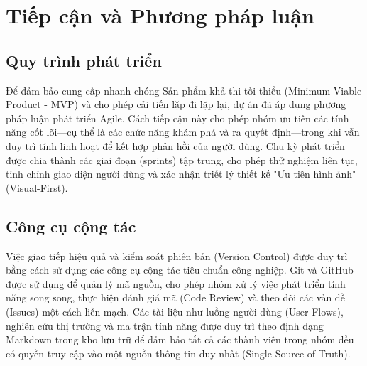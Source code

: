 \section{Tiếp cận và Phương pháp luận}
\label{sec:approach_methodology}

\subsection{Quy trình phát triển}
Để đảm bảo cung cấp nhanh chóng Sản phẩm khả thi tối thiểu (Minimum Viable Product - MVP) và cho phép cải tiến lặp đi lặp lại, dự án đã áp dụng phương pháp luận phát triển Agile. Cách tiếp cận này cho phép nhóm ưu tiên các tính năng cốt lõi—cụ thể là các chức năng khám phá và ra quyết định—trong khi vẫn duy trì tính linh hoạt để kết hợp phản hồi của người dùng. Chu kỳ phát triển được chia thành các giai đoạn (sprints) tập trung, cho phép thử nghiệm liên tục, tinh chỉnh giao diện người dùng và xác nhận triết lý thiết kế "Ưu tiên hình ảnh" (Visual-First).

\subsection{Công cụ cộng tác}
Việc giao tiếp hiệu quả và kiểm soát phiên bản (Version Control) được duy trì bằng cách sử dụng các công cụ cộng tác tiêu chuẩn công nghiệp. Git và GitHub được sử dụng để quản lý mã nguồn, cho phép nhóm xử lý việc phát triển tính năng song song, thực hiện đánh giá mã (Code Review) và theo dõi các vấn đề (Issues) một cách liền mạch. Các tài liệu như luồng người dùng (User Flows), nghiên cứu thị trường và ma trận tính năng được duy trì theo định dạng Markdown trong kho lưu trữ để đảm bảo tất cả các thành viên trong nhóm đều có quyền truy cập vào một nguồn thông tin duy nhất (Single Source of Truth).

